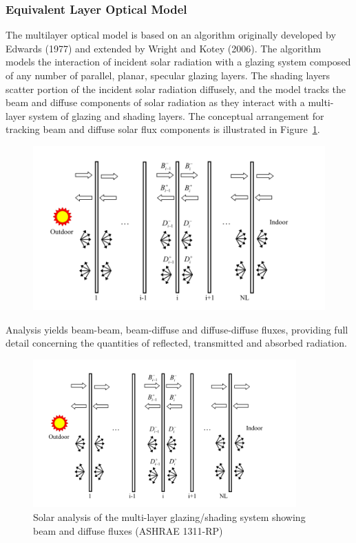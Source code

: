 \subsubsection{Equivalent Layer Optical Model}\label{equivalent-layer-optical-model}

The multilayer optical model is based on an algorithm originally developed by Edwards (1977) and extended by Wright and Kotey (2006). The algorithm models the interaction of incident solar radiation with a glazing system composed of any number of parallel, planar, specular glazing layers. The shading layers scatter portion of the incident solar radiation diffusely, and the model tracks the beam and diffuse components of solar radiation as they interact with a multi-layer system of glazing and shading layers. The conceptual arrangement for tracking beam and diffuse solar flux components is illustrated in Figure~\ref{fig:solar-analysis-of-the-multi-layer}.

\begin{figure}[htbp]
\centering
\includegraphics{media/image1828.svg.png}
\caption{}
\end{figure}

Analysis yields beam-beam, beam-diffuse and diffuse-diffuse fluxes, providing full detail concerning the quantities of reflected, transmitted and absorbed radiation.

\begin{figure}[hbtp] %
\centering
\includegraphics[width=0.9\textwidth, height=0.9\textheight, keepaspectratio=true]{media/image1829.svg.png}
\caption{Solar analysis of the multi-layer glazing/shading system showing beam and diffuse fluxes (ASHRAE 1311-RP) \protect \label{fig:solar-analysis-of-the-multi-layer}}
\end{figure}


